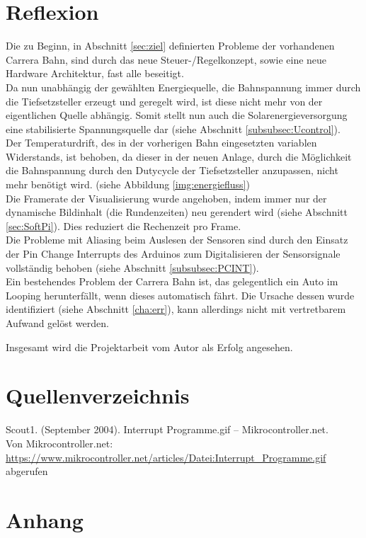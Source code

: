 \documentclass[a4paper, 11pt]{report}
\begin{document}
\chapter{Reflexion}

Die zu Beginn, in Abschnitt \ref{sec:ziel} definierten Probleme der vorhandenen Carrera Bahn, sind durch das neue Steuer-/Regelkonzept, sowie eine neue Hardware Architektur, fast alle beseitigt.\\
Da nun unabhängig der gewählten Energiequelle, die Bahnspannung immer durch die Tiefsetzsteller erzeugt und geregelt wird, ist diese nicht mehr von der eigentlichen Quelle abhängig.
Somit stellt nun auch die Solarenergieversorgung eine stabilisierte Spannungsquelle dar (siehe Abschnitt \ref{subsubsec:Ucontrol}).\\
Der Temperaturdrift, des in der vorherigen Bahn eingesetzten variablen Widerstands, ist behoben, da dieser in der neuen Anlage, durch die Möglichkeit die Bahnspannung durch den Dutycycle der Tiefsetzsteller anzupassen, nicht mehr benötigt wird. (siehe Abbildung \ref{img:energiefluss})\\
Die Framerate der Visualisierung wurde angehoben, indem immer nur der dynamische Bildinhalt (die Rundenzeiten) neu gerendert wird (siehe Abschnitt \ref{sec:SoftPi}). Dies reduziert die Rechenzeit pro Frame.\\
Die Probleme mit Aliasing beim Auslesen der Sensoren sind durch den Einsatz der \glqq Pin Change Interrupts\grqq{} des Arduinos zum Digitalisieren der Sensorsignale vollständig behoben (siehe Abschnitt \ref{subsubsec:PCINT}).\\

Ein bestehendes Problem der Carrera Bahn ist, das gelegentlich ein Auto im Looping herunterfällt, wenn dieses automatisch fährt. Die Ursache dessen wurde identifiziert (siehe Abschnitt \ref{cha:err}), kann allerdings nicht mit vertretbarem Aufwand gelöst werden.

Insgesamt wird die Projektarbeit vom Autor als Erfolg angesehen.
\chapter{Quellenverzeichnis}
Scout1. (September 2004). Interrupt Programme.gif – Mikrocontroller.net.
\\Von Mikrocontroller.net: \href{https://www.mikrocontroller.net/articles/Datei:Interrupt_Programme.gif}
{\url{https://www.mikrocontroller.net/articles/Datei:Interrupt_Programme.gif}} abgerufen \label{src:scout1}
\chapter{Anhang}
\end{document}

